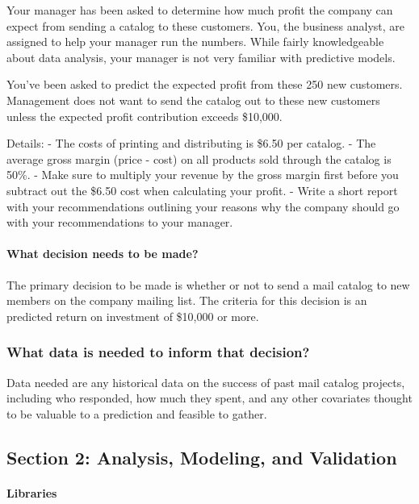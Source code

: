 \documentclass[11pt]{article}
\begin{document}
Your manager has been asked to determine how much profit the company can
expect from sending a catalog to these customers. You, the business
analyst, are assigned to help your manager run the numbers. While fairly
knowledgeable about data analysis, your manager is not very familiar
with predictive models.

You've been asked to predict the expected profit from these 250 new
customers. Management does not want to send the catalog out to these new
customers unless the expected profit contribution exceeds \$10,000.

Details: - The costs of printing and distributing is \$6.50 per catalog.
- The average gross margin (price - cost) on all products sold through
the catalog is 50\%. - Make sure to multiply your revenue by the gross
margin first before you subtract out the \$6.50 cost when calculating
your profit. - Write a short report with your recommendations outlining
your reasons why the company should go with your recommendations to your
manager.

    \paragraph{What decision needs to be
made?}\label{what-decision-needs-to-be-made}

The primary decision to be made is whether or not to send a mail catalog
to new members on the company mailing list. The criteria for this
decision is an predicted return on investment of \$10,000 or more.

    \subsubsection{What data is needed to inform that
decision?}\label{what-data-is-needed-to-inform-that-decision}

Data needed are any historical data on the success of past mail catalog
projects, including who responded, how much they spent, and any other
covariates thought to be valuable to a prediction and feasible to
gather.

    \newpage

    \subsection{Section 2: Analysis, Modeling, and
Validation}\label{section-2-analysis-modeling-and-validation}

    \paragraph{Libraries}\label{libraries}
\end{document}
